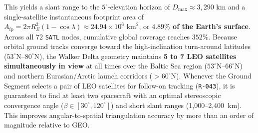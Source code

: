 \documentclass[11pt,a4paper]{article}
\providecommand{\abbr}[1]{#1}
\begin{document}
\begin{itemize}
    This yields a slant range to the $5^\circ$-elevation horizon of $D_{\max} \approx 3{,}290\text{ km}$ and a single-satellite instantaneous footprint area of $A_{\text{fp}} = 2\pi R_E^2(1 - \cos\lambda) \approx 24.94 \times 10^6\text{ km}^2$, or \textbf{$4.89\%$ of the Earth's surface}. Across all 72 \texttt{SATL} nodes, cumulative global coverage reaches \textbf{$352\%$}. Because orbital ground tracks converge toward the high-inclination turn-around latitudes ($53^\circ\text{N}\text{--}80^\circ\text{N}$), the Walker Delta geometry maintains \textbf{5 to 7 \abbr{LEO} satellites simultaneously in view} at all times over the Baltic Sea region ($53^\circ\text{N}\text{--}66^\circ\text{N}$) and northern Eurasian/Arctic launch corridors ($> 60^\circ\text{N}$). Whenever the Ground Segment selects a pair of \abbr{LEO} satellites for follow-on tracking (\texttt{R-043}), it is guaranteed to find at least two spacecraft with an optimal stereoscopic convergence angle ($\beta \in [30^\circ, 120^\circ]$) and short slant ranges (1,000--2,400~km). This improves angular-to-spatial triangulation accuracy by more than an order of magnitude relative to \abbr{GEO}.
\end{itemize}
\end{document}
